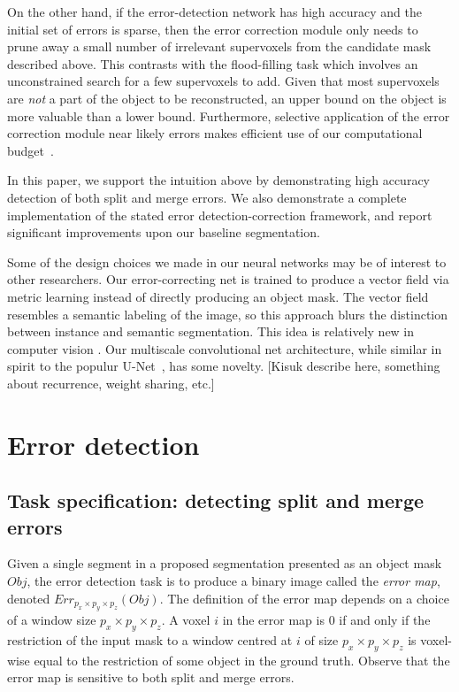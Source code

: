 \documentclass{article}
\begin{document}
On the other hand, if the error-detection network has high accuracy and the initial set of errors is sparse, then the error correction module only needs to prune away a small number of irrelevant supervoxels from the candidate mask described above. This contrasts with the flood-filling task which involves an unconstrained search for a few supervoxels to add. Given that most supervoxels are \textit{not} a part of the object to be reconstructed, an upper bound on the object is more valuable than a lower bound. Furthermore, selective application of the error correction module near likely errors makes efficient use of our computational budget~\cite{multipass}.

In this paper, we support the intuition above by demonstrating high accuracy detection of both split and merge errors. We also demonstrate a complete implementation of the stated error detection-correction framework, and report significant improvements upon our baseline segmentation.


Some of the design choices we made in our neural networks may be of interest to other researchers. Our error-correcting net is trained to produce a vector field via metric learning instead of directly producing an object mask. The vector field resembles a semantic labeling of the image, so this approach blurs the distinction between instance and semantic segmentation. This idea is relatively new in computer vision \cite{harley2015metric,fathi2017metric,brabandere2017metric}. Our multiscale convolutional net architecture, while similar in spirit to the populur U-Net~\cite{unet}, has some novelty.  [Kisuk describe here, something about recurrence, weight sharing, etc.]

\section{Error detection}
\subsection{Task specification: detecting split and merge errors}
\label{sec:detection_spec}
Given a single segment in a proposed segmentation presented as an object mask $Obj$, the error detection task is to produce a binary image called the \textit{error map}, denoted $Err_{p_x\times p_y \times p_z}(Obj)$. The definition of the error map depends on a choice of a window size $p_x \times p_y \times p_z$. A voxel $i$ in the error map is 0 if and only if the restriction of the input mask to a window centred at $i$ of size $p_x \times p_y \times p_z$ is voxel-wise equal to the restriction of some object in the ground truth. Observe that the error map is sensitive to both split and merge errors.
\end{document}

